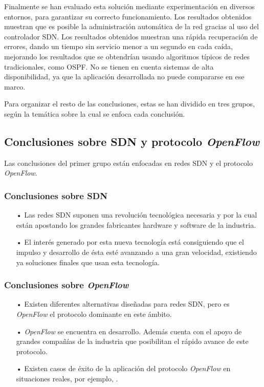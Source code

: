 \documentclass[a4paper,11pt]{book}
\begin{document}
Finalmente se han evaluado esta solución mediante experimentación en diversos entornos, para garantizar su correcto funcionamiento. Los resultados obtenidos muestran que es posible la administración automática de la red gracias al uso del controlador \ac{SDN}. Los resultados obtenidos muestran una rápida recuperación de errores, dando un tiempo sin servicio menor a un segundo en cada caída, mejorando los resultados que se obtendrían usando algoritmos típicos de redes tradicionales, como \ac{OSPF}. No se tienen en cuenta sistemas de alta disponibilidad, ya que la aplicación desarrollada no puede compararse en ese marco.

Para organizar el resto de las conclusiones, estas se han dividido en tres grupos, según la temática sobre la cual se enfoca cada conclusión.

\subsection{Conclusiones sobre \ac{SDN} y protocolo \emph{OpenFlow}}

Las conclusiones del primer grupo están enfocadas en redes \ac{SDN} y el protocolo \emph{OpenFlow}.

\subsubsection{Conclusiones sobre \ac{SDN}}

\begin{itemize}
\item[•] Las redes \ac{SDN} suponen una revolución tecnológica necesaria y por la cual están apostando los grandes fabricantes hardware y software de la industria.
\item[•] El interés generado por esta nueva tecnología está consiguiendo que el impulso y desarrollo de ésta esté avanzando a una gran velocidad, existiendo ya soluciones finales que usan esta tecnología.
\end{itemize}

\subsubsection{Conclusiones sobre \emph{OpenFlow}}

\begin{itemize}
\item[•] Existen diferentes alternativas diseñadas para redes \ac{SDN}, pero es \emph{OpenFlow} el protocolo dominante en este ámbito.
\item[•] \emph{OpenFlow} se encuentra en desarrollo. Además cuenta con el apoyo de grandes compañías de la industria que posibilitan el rápido avance de este protocolo.
\item[•] Existen casos de éxito de la aplicación del protocolo \emph{OpenFlow} en situaciones reales, por ejemplo, \cite{googleOpenFlow}.
\end{itemize}
\end{document}
